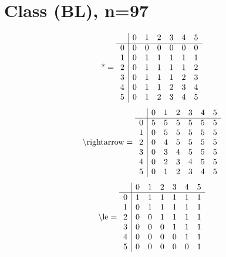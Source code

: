 \documentclass[11pt]{article}
\begin{document}
\section{Class (BL), n=97}
\[\text{*} = 
\begin{array}{r | r r r r r r}
 & 0 & 1 & 2 & 3 & 4 & 5 \\ \hline
0 & 0 & 0 & 0 & 0 & 0 & 0 \\
1 & 0 & 1 & 1 & 1 & 1 & 1 \\
2 & 0 & 1 & 1 & 1 & 1 & 2 \\
3 & 0 & 1 & 1 & 1 & 2 & 3 \\
4 & 0 & 1 & 1 & 2 & 3 & 4 \\
5 & 0 & 1 & 2 & 3 & 4 & 5 \\
\end{array}
\]
\[\text{\textbackslash rightarrow} = 
\begin{array}{r | r r r r r r}
 & 0 & 1 & 2 & 3 & 4 & 5 \\ \hline
0 & 5 & 5 & 5 & 5 & 5 & 5 \\
1 & 0 & 5 & 5 & 5 & 5 & 5 \\
2 & 0 & 4 & 5 & 5 & 5 & 5 \\
3 & 0 & 3 & 4 & 5 & 5 & 5 \\
4 & 0 & 2 & 3 & 4 & 5 & 5 \\
5 & 0 & 1 & 2 & 3 & 4 & 5 \\
\end{array}
\]
\[\text{\textbackslash le} = 
\begin{array}{r | r r r r r r}
 & 0 & 1 & 2 & 3 & 4 & 5 \\ \hline
0 & 1 & 1 & 1 & 1 & 1 & 1 \\
1 & 0 & 1 & 1 & 1 & 1 & 1 \\
2 & 0 & 0 & 1 & 1 & 1 & 1 \\
3 & 0 & 0 & 0 & 1 & 1 & 1 \\
4 & 0 & 0 & 0 & 0 & 1 & 1 \\
5 & 0 & 0 & 0 & 0 & 0 & 1 \\
\end{array}
\]
\end{document}

